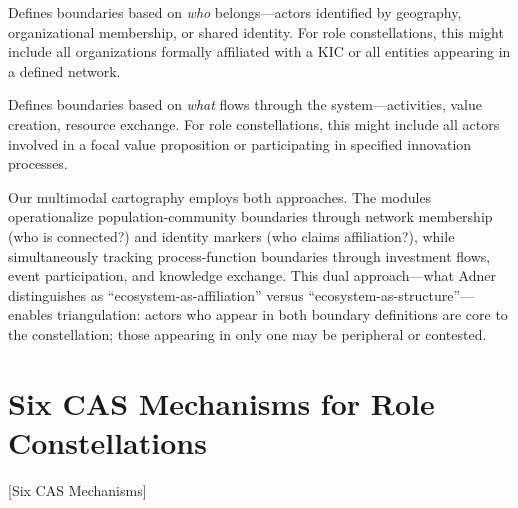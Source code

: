 \documentclass[../main.tex]{subfiles}
\begin{document}
\begin{description}[leftmargin=0.5cm, itemsep=0.2em]
\item[Population-community approach] Defines boundaries based on \emph{who} belongs---actors identified by geography, organizational membership, or shared identity. For role constellations, this might include all organizations formally affiliated with a KIC or all entities appearing in a defined network.

\item[Process-function approach] Defines boundaries based on \emph{what} flows through the system---activities, value creation, resource exchange. For role constellations, this might include all actors involved in a focal value proposition or participating in specified innovation processes.
\end{description}

Our multimodal cartography employs both approaches. The \RoleBox modules operationalize population-community boundaries through network membership (who is connected?) and identity markers (who claims affiliation?), while simultaneously tracking process-function boundaries through investment flows, event participation, and knowledge exchange. This dual approach---what Adner \cite{adner2017ecosystem} distinguishes as ``ecosystem-as-affiliation'' versus ``ecosystem-as-structure''---enables triangulation: actors who appear in both boundary definitions are core to the constellation; those appearing in only one may be peripheral or contested.


\section{Six CAS Mechanisms for Role Constellations}[Six CAS Mechanisms]
\end{document}
